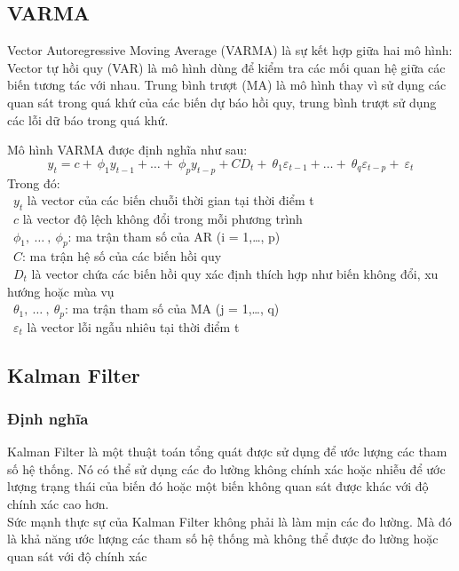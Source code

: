 \subsection{VARMA}
Vector Autoregressive Moving Average (VARMA) là sự kết hợp giữa hai mô hình: Vector tự hồi quy (VAR) là mô hình dùng để kiểm tra các mối quan hệ giữa các biến tương tác với nhau. Trung bình trượt (MA) là mô hình thay vì sử dụng các quan sát trong quá khứ của các biến dự báo hồi quy, trung bình trượt sử dụng các lỗi dữ báo trong quá khứ. 
\par
Mô hình VARMA được định nghĩa như sau:
\[y_{t} = c + \ \phi_{1}y_{t - 1} + \ldots + \ \phi_{p}y_{t - p} + CD_{t} + \ \theta_{1}\varepsilon_{t - 1} + \ldots + \ \theta_{q}\varepsilon_{t - p} + \ \varepsilon_{t}\]
Trong đó:\\
    \indent\textbullet\ \(y_{t}\) là vector của các biến chuỗi thời gian tại thời điểm t\\
    \indent\textbullet\ \(c\) là vector độ lệch không đổi trong mỗi phương trình\\
    \indent\textbullet\ \(\phi_{1},\ \ldots\ ,\ \phi_{p}\): ma trận tham số của AR (i = 1,…, p)\\
    \indent\textbullet\ \(C\): ma trận hệ số của các biến hồi quy\\
    \indent\textbullet\ \(D_{t}\) là vector chứa các biến hồi quy xác định thích hợp như biến không đổi, xu hướng hoặc mùa vụ\\
    \indent\textbullet\ \(\theta_{1},\ \ldots\ ,\ \theta_{p}\): ma trận tham số của MA (j = 1,…, q)\\
    \indent\textbullet\ \(\varepsilon_{t}\) là vector lỗi ngẫu nhiêu tại thời điểm t
\subsection{Kalman Filter}
\subsubsection{Định nghĩa}
Kalman Filter là một thuật toán tổng quát được sử dụng để ước lượng các tham số hệ thống. Nó có thể sử dụng các đo lường không chính xác hoặc nhiễu để ước lượng trạng thái của biến đó hoặc một biến không quan sát được khác với độ chính xác cao hơn.
\\Sức mạnh thực sự của Kalman Filter không phải là làm mịn các đo lường. Mà đó là khả năng ước lượng các tham số hệ thống mà không thể được đo lường hoặc quan sát với độ chính xác
